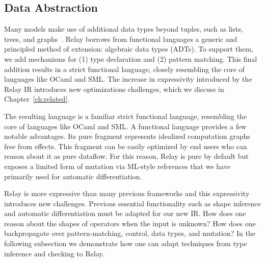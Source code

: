 \subsection{Data Abstraction}
Many models make use of additional data types beyond
  tuples, such as lists, trees, and graphs~\citep{char-rnn, tree_lstm, graph_lstm}.
Relay borrows from functional languages
  a generic and principled method of extension:
  algebraic data types (ADTs).
To support them, we add mechanisms for
  (1) type declaration and
  (2) pattern matching.
This final addition results in a strict functional language,
  closely resembling the core of languages like OCaml and SML.
The increase in expressivity introduced by the Relay IR introduces
  new optimizations challenges, which we
  discuss in Chapter~\ref{ch:related}.

The resulting language is a familiar strict functional language,
  resembling the core of languages like OCaml and SML.
A functional language provides a few notable advantages.
Its pure fragment represents idealized computation graphs free
  from effects. This fragment can be easily optimized by end users who
  can reason about it as pure dataflow.
For this reason, Relay is pure by default but exposes a limited
  form of mutation via ML-style references that we have
  primarily used for automatic differentiation.

Relay is more expressive than many previous frameworks and this expressivity introduces new challenges.
  Previous essential functionality such
    as shape inference and automatic differentiation must be adapted for
    our new IR.
How does one reason about the shapes of operators when the input is unknown?
How does one backpropagate over pattern-matching, control, data types, and mutation?
In the following subsection we demonstrate how one can adapt techniques
  from type inference and checking to Relay.




